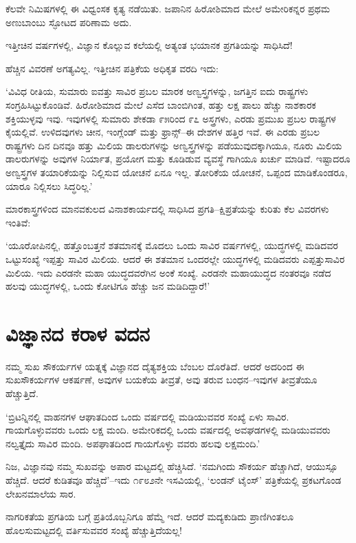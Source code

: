 ಕೆಲವೇ ನಿಮಿಷಗಳಲ್ಲಿ ಈ ವಿಧ್ವಂಸಕ ಕೃತ್ಯ ನಡೆಯಿತು. ಜಪಾನಿನ ಹಿರೋಶಿಮಾದ ಮೇಲೆ ಅಮೇರಿಕನ್ನರ ಪ್ರಥಮ ಅಣುಬಾಂಬು ಸ್ಫೋಟದ ಪರಿಣಾಮ ಅದು.

ಇತ್ತೀಚಿನ ವರ್ಷಗಳಲ್ಲಿ, ವಿಜ್ಞಾನ ಕೊಲ್ಲುವ ಕಲೆಯಲ್ಲಿ ಅತ್ಯಂತ ಭಯಾನಕ ಪ್ರಗತಿಯನ್ನು ಸಾಧಿಸಿದೆ!

ಹೆಚ್ಚಿನ ವಿವರಣೆ ಅಗತ್ಯವಿಲ್ಲ. ಇತ್ತೀಚಿನ ಪತ್ರಿಕೆಯ ಅಧಿಕೃತ ವರದಿ ಇದು:

‘ವಿವಿಧ ರೀತಿಯ, ಸುಮಾರು ಐವತ್ತು ಸಾವಿರ ಪ್ರಬಲ ಮಾರಕ ಅಣ್ವಸ್ತ್ರಗಳನ್ನು, ಜಗತ್ತಿನ ಐದು ರಾಷ್ಟ್ರಗಳು ಸಂಗ್ರಹಿಸಿಟ್ಟುಕೊಂಡಿವೆ. ಹಿರೋಶಿಮಾದ ಮೇಲೆ ಎಸೆದ ಬಾಂಬಿಗಿಂತ, ಹತ್ತು ಲಕ್ಷ ಪಾಲು ಹೆಚ್ಚು ನಾಶಕಾರಕ ಶಕ್ತಿಯುಳ್ಳವು ಇವು. ಇವುಗಳಲ್ಲಿ ಸುಮಾರು ಶೇಕಡಾ ೯೫ರಿಂದ ೯೭ ಅಸ್ತ್ರಗಳು, ಎರಡು ಪ್ರಮುಖ ಪ್ರಬಲ ರಾಷ್ಟ್ರಗಳ ಕೈಯಲ್ಲಿವೆ. ಉಳಿದವುಗಳು ಚೀನ, ಇಂಗ್ಲೆಂಡ್ ಮತ್ತು ಫ್ರಾನ್ಸ್​–ಈ ದೇಶಗಳ ಹತ್ತಿರ ಇವೆ. ಈ ಎರಡು ಪ್ರಬಲ ರಾಷ್ಟ್ರಗಳು ದಿನ ದಿನವೂ ಹತ್ತು ಮಿಲಿಯ ಡಾಲರುಗಳನ್ನು ಅಣ್ವಸ್ತ್ರಗಳನ್ನು ಪಡೆಯುವುದಕ್ಕಾಗಿಯೂ, ನೂರು ಮಿಲಿಯ ಡಾಲರುಗಳನ್ನು ಅವುಗಳ ನಿರ್ಯಾತ, ಪ್ರಯೋಗ ಮತ್ತು ಕೂಡಿಡುವ ವ್ಯವಸ್ಥೆ ಗಾಗಿಯೂ ಖರ್ಚು ಮಾಡಿವೆ. ಇಷ್ಟಾದರೂ ಅಣ್ವಸ್ತ್ರಗಳ ತಯಾರಿಕೆಯನ್ನು ನಿಲ್ಲಿಸುವ ಯೋಚನೆ ಏನೂ ಇಲ್ಲ. ತೋರಿಕೆಯ ಯೋಚನೆ, ಒಪ್ಪಂದ ಮಾಡಿಕೊಂಡರೂ, ಯಾರೂ ನಿಲ್ಲಿಸಲು ಸಿದ್ಧರಿಲ್ಲ.’

ಮಾರಕಾಸ್ತ್ರಗಳಿಂದ ಮಾನವಕುಲದ ವಿನಾಶಕಾರ್ಯದಲ್ಲಿ ಸಾಧಿಸಿದ ಪ್ರಗತಿ–ಕ್ಷಿಪ್ರತೆಯನ್ನು ಕುರಿತು ಕೆಲ ವಿವರಗಳು ಇಂತಿವೆ:

‘ಯೂರೋಪಿನಲ್ಲಿ, ಹತ್ತೊಂಬತ್ತನೆ ಶತಮಾನಕ್ಕೆ ಮೊದಲು ಒಂದು ಸಾವಿರ ವರ್ಷಗಳಲ್ಲಿ, ಯುದ್ಧಗಳಲ್ಲಿ ಮಡಿದವರ ಒಟ್ಟುಸಂಖ್ಯೆ ಇಪ್ಪತ್ತು ಸಾವಿರ ಮಿಲಿಯ. ಆದರೆ ಈ ಶತಮಾನ ಒಂದರಲ್ಲೇ ಯುದ್ಧಗಳಲ್ಲಿ ಮಡಿದವರು ಎಪ್ಪತ್ತುಸಾವಿರ ಮಿಲಿಯ. ಇದು ಎರಡನೇ ಮಹಾ ಯುದ್ಧದವರೆಗಿನ ಅಂಕೆ ಸಂಖ್ಯೆ. ಎರಡನೇ ಮಹಾಯುದ್ಧದ ನಂತರವೂ ನಡೆದ ಹಲವು ಯುದ್ಧಗಳಲ್ಲಿ, ಒಂದು ಕೋಟಿಗೂ ಹೆಚ್ಚು ಜನ ಮಡಿದಿದ್ದಾರೆ!’


\section{ವಿಜ್ಞಾನದ ಕರಾಳ ವದನ}

ನಮ್ಮ ಸುಖ ಸೌಕರ್ಯಗಳ ಯತ್ನಕ್ಕೆ ವಿಜ್ಞಾನದ ದೈತ್ಯಶಕ್ತಿಯ ಬೆಂಬಲ ದೊರೆತಿದೆ. ಆದರೆ ಅದರಿಂದ ಈ ಸುಖಸೌಕರ್ಯಗಳ ಆಕರ್ಷಣೆ, ಅವುಗಳ ಬಯಕೆಯ ತೀವ್ರತೆ, ಅವು ತರುವ ಬಂಧನ–ಇವುಗಳ ತೀವ್ರತೆಯೂ ಹೆಚ್ಚುತ್ತಿದೆ.

‘ಬ್ರಿಟನ್ನಿನಲ್ಲಿ ವಾಹನಗಳ ಆಘಾತದಿಂದ ಒಂದು ವರ್ಷದಲ್ಲಿ ಮಡಿಯುವವರ ಸಂಖ್ಯೆ ಏಳು ಸಾವಿರ. ಗಾಯಗೊಳ್ಳುವವರು ಒಂದು ಲಕ್ಷ ಮಂದಿ. ಅಮೇರಿಕದಲ್ಲಿ ಒಂದು ವರ್ಷದಲ್ಲಿ ಅವಘಡಗಳಲ್ಲಿ ಮಡಿಯುವವರು ನಲ್ವತ್ತೈದು ಸಾವಿರ ಮಂದಿ. ಅಪಘಾತದಿಂದ ಗಾಯಗೊಳ್ಳು ವವರು ಹಲವು ಲಕ್ಷಮಂದಿ.’

ನಿಜ, ವಿಜ್ಞಾನವು ನಮ್ಮ ಸುಖವನ್ನು ಅಪಾರ ಮಟ್ಟದಲ್ಲಿ ಹೆಚ್ಚಿಸಿದೆ. ‘ನಮಗಿಂದು ಸೌಕರ್ಯ ಹೆಚ್ಚಾಗಿದೆ, ಆಯುಸ್ಸೂ ಹೆಚ್ಚಿದೆ. ಆದರೆ ಕುಡಿತವೂ ಹೆಚ್ಚಿದೆ’–ಇದು ೧೯೮೨ನೇ ಇಸವಿಯಲ್ಲಿ, ‘ಲಂಡನ್ ಟೈಂಸ್​’ ಪತ್ರಿಕೆಯಲ್ಲಿ ಪ್ರಕಟಗೊಂಡ ಲೇಖನಮಾಲೆಯ ಸಾರ.

ನಾಗರಿಕತೆಯ ಪ್ರಗತಿಯ ಬಗ್ಗೆ ಪ್ರತಿಯೊಬ್ಬನಿಗೂ ಹೆಮ್ಮೆ ಇದೆ. ಆದರೆ ಮದ್ಯಕುಡಿದು ಪ್ರಾಣಿಗಿಂತಲೂ ಹೊಲಸುಮಟ್ಟದಲ್ಲಿ ವರ್ತಿಸುವವರ ಸಂಖ್ಯೆ ಹೆಚ್ಚುತ್ತಿದೆಯಲ್ಲ!

